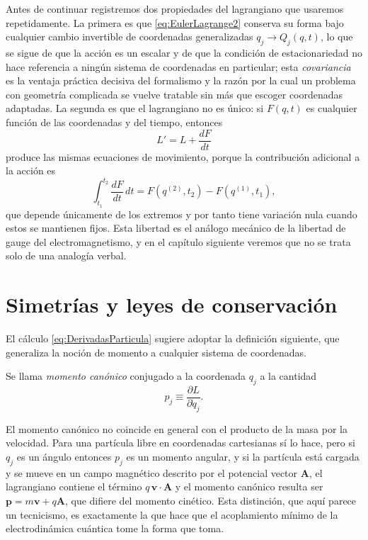         Antes de continuar registremos dos propiedades del lagrangiano que usaremos repetidamente. La primera es que \eqref{eq:EulerLagrange2} conserva su forma bajo cualquier cambio invertible de coordenadas generalizadas $q_{j}\rightarrow Q_{j}(q,t)$, lo que se sigue de que la acción es un escalar y de que la condición de estacionariedad no hace referencia a ningún sistema de coordenadas en particular; esta \textit{covariancia} es la ventaja práctica decisiva del formalismo y la razón por la cual un problema con geometría complicada se vuelve tratable sin más que escoger coordenadas adaptadas. La segunda es que el lagrangiano no es único: si $F(q,t)$ es cualquier función de las coordenadas y del tiempo, entonces
        \begin{equation}\label{eq:GaugeLagrangiano}
            L' = L + \frac{dF}{dt}
        \end{equation}
        produce las mismas ecuaciones de movimiento, porque la contribución adicional a la acción es
        \begin{equation}\label{eq:GaugeAccion}
            \int_{t_{1}}^{t_{2}}\frac{dF}{dt}\,dt = F\left(q^{(2)},t_{2}\right) - F\left(q^{(1)},t_{1}\right),
        \end{equation}
        que depende únicamente de los extremos y por tanto tiene variación nula cuando estos se mantienen fijos. Esta libertad es el análogo mecánico de la libertad de gauge del electromagnetismo, y en el capítulo siguiente veremos que no se trata solo de una analogía verbal.

\section{Simetrías y leyes de conservación}

        El cálculo \eqref{eq:DerivadasParticula} sugiere adoptar la definición siguiente, que generaliza la noción de momento a cualquier sistema de coordenadas.

        \begin{myDef}\label{def:MomentoCanonico}
            Se llama \textit{momento canónico} conjugado a la coordenada $q_{j}$ a la cantidad
            \begin{equation}\label{eq:MomentoCanonico}
                p_{j} \equiv \frac{\partial L}{\partial\dot{q}_{j}} .
            \end{equation}
        \end{myDef}

        El momento canónico no coincide en general con el producto de la masa por la velocidad. Para una partícula libre en coordenadas cartesianas sí lo hace, pero si $q_{j}$ es un ángulo entonces $p_{j}$ es un momento angular, y si la partícula está cargada y se mueve en un campo magnético descrito por el potencial vector $\mathbf{A}$, el lagrangiano contiene el término $q\,\mathbf{v}\cdot\mathbf{A}$ y el momento canónico resulta ser $\mathbf{p} = m\mathbf{v} + q\mathbf{A}$, que difiere del momento cinético. Esta distinción, que aquí parece un tecnicismo, es exactamente la que hace que el acoplamiento mínimo de la electrodinámica cuántica tome la forma que toma.

